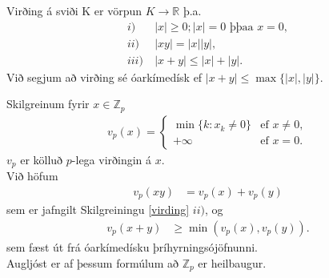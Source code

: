 \begin{skilgr}\label{virding}
 Virðing á sviði K er vörpun $K \rightarrow \mathbb{R}$ þ.a.
\begin{align*}
 i)& \  |x|\geq 0; |x| = 0 \mbox{ þþaa } x = 0, \\
 ii)& \  |xy| = |x||y|, \\
 iii)& \  |x+y| \leq |x| + |y|.
\end{align*}
Við segjum að virðing sé óarkímedísk ef $|x+y| \leq \max \{ |x|,|y| \}$.
\end{skilgr}
\begin{skilgr}
Skilgreinum fyrir $x \in \mathbb{Z}_p$
\begin{align*}
v_p(x) = 
\begin{cases}
 \min \{ k:x_k \neq 0 \} & \mbox{ef  } x \neq 0, \\
+ \infty & \mbox{ef  } x = 0.
\end{cases} 
\end{align*}
$v_p$ er kölluð $p$-lega virðingin á $x$. \\ Við höfum
\begin{align}\label{starwars}
 v_p(xy) &= v_p(x) + v_p(y)
\end{align}
sem er jafngilt Skilgreiningu \ref{virding} $ii)$, og
\begin{align*}
 v_p(x+y) &\geq \min(v_p(x),v_p(y)).
\end{align*}
sem fæst út frá óarkímedísku þríhyrningsójöfnunni. \\
Augljóst er af þessum formúlum að $\mathbb{Z}_p$ er heilbaugur.
\end{skilgr}
